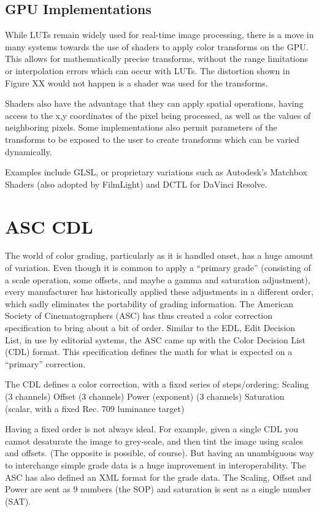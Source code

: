 \subsection{GPU Implementations}

While LUTs remain widely used for real-time image processing, there is a move in many systems towards the use of shaders to apply color transforms on the GPU. This allows for mathematically precise transforms, without the range limitations or interpolation errors which can occur with LUTs. The distortion shown in Figure XX would not happen is a shader was used for the transforms.

Shaders also have the advantage that they can apply spatial operations, having access to the x,y coordinates of the pixel being processed, as well as the values of neighboring pixels. Some implementations also permit parameters of the transforms to be exposed to the user to create transforms which can be varied dynamically.

Examples include GLSL, or proprietary variations such as Autodesk’s Matchbox Shaders (also adopted by FilmLight) and DCTL for DaVinci Resolve.

\section{ASC CDL}

The world of color grading, particularly as it is handled onset, has a huge amount of variation. Even though it is common to apply a “primary grade” (consisting of a scale operation, some offsets, and maybe a gamma and saturation adjustment), every manufacturer has historically applied these adjustments in a different order, which sadly eliminates the portability of grading information. The American Society of Cinematographers (ASC) has thus created a color correction specification to bring about a bit of order. Similar to the EDL, Edit Decision List, in use by editorial systems, the ASC came up with the Color Decision List (CDL) format. This specification defines the math for what is expected on a “primary” correction.

The CDL defines a color correction, with a fixed series of steps/ordering:
 Scaling (3 channels)
 Offset (3 channels)
 Power (exponent) (3 channels)
 Saturation (scalar, with a fixed Rec. 709 luminance target)

Having a fixed order is not always ideal. For example, given a single CDL you cannot desaturate the image to grey-scale, and then tint the image using scales and offsets. (The opposite is possible, of course). But having an unambiguous way to interchange simple grade data is a huge improvement in interoperability. The ASC has also defined an XML format for the grade data. The Scaling, Offset and Power are sent as 9 numbers (the SOP) and saturation is sent as a single number (SAT).

